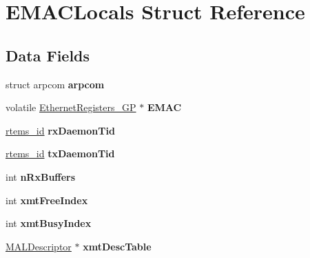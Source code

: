 \hypertarget{structEMACLocals}{}\section{E\+M\+A\+C\+Locals Struct Reference}
\label{structEMACLocals}
\subsection*{Data Fields}
\begin{DoxyCompactItemize}
\item 
\mbox{\label{structEMACLocals_a3a051f8081e52ae24adcf8c076810de9}} 
struct arpcom {\bfseries arpcom}
\item 
\mbox{\label{structEMACLocals_a9687dead163dc838d421e27a3c736b13}} 
volatile \mbox{\hyperlink{structEthernetRegisters__GP}{Ethernet\+Registers\+\_\+\+GP}} $\ast$ {\bfseries E\+M\+AC}
\item 
\mbox{\label{structEMACLocals_a03df6466390f49f98d984921e7487ef8}} 
\mbox{\hyperlink{group__ClassicTasks_gab20892b814dced7dd4e5b9bf42becd57}{rtems\+\_\+id}} {\bfseries rx\+Daemon\+Tid}
\item 
\mbox{\label{structEMACLocals_a7b8f656993891bdd946b63b755280c2e}} 
\mbox{\hyperlink{group__ClassicTasks_gab20892b814dced7dd4e5b9bf42becd57}{rtems\+\_\+id}} {\bfseries tx\+Daemon\+Tid}
\item 
\mbox{\label{structEMACLocals_a81ec6a56c21fd57ac7581e8b2fb75c87}} 
int {\bfseries n\+Rx\+Buffers}
\item 
\mbox{\label{structEMACLocals_a895c13c227dac7466c712e290a0811c5}} 
int {\bfseries xmt\+Free\+Index}
\item 
\mbox{\label{structEMACLocals_af78f9479dcd3ca29ef2738413207881f}} 
int {\bfseries xmt\+Busy\+Index}
\item 
\mbox{\label{structEMACLocals_a6f5be7b8806148afb5f9201f8cb49321}} 
\mbox{\hyperlink{structMALDescriptor}{M\+A\+L\+Descriptor}} $\ast$ {\bfseries xmt\+Desc\+Table}
\item 
\mbox{\label{structEMACLocals_ae92b0343992a8ae2bd1bec832f8cca16}} 

\end{DoxyCompactItemize}
